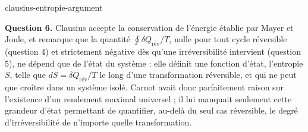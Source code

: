 \begin{exo}{clausius-entropie-argument}
\begin{solution}
\textbf{Question 6.} Clausius accepte la conservation de l'énergie établie par Mayer et Joule, et remarque que la quantité $\oint \delta Q_{\text{rév}}/T$, nulle pour tout cycle réversible (question 4) et strictement négative dès qu'une irréversibilité intervient (question 5), ne dépend que de l'état du système : elle définit une fonction d'état, l'entropie $S$, telle que $dS = \delta Q_{\text{rév}}/T$ le long d'une transformation réversible, et qui ne peut que croître dans un système isolé. Carnot avait donc parfaitement raison sur l'existence d'un rendement maximal universel ; il lui manquait seulement cette grandeur d'état permettant de quantifier, au-delà du seul cas réversible, le degré d'irréversibilité de n'importe quelle transformation.
\end{solution}
\end{exo}
